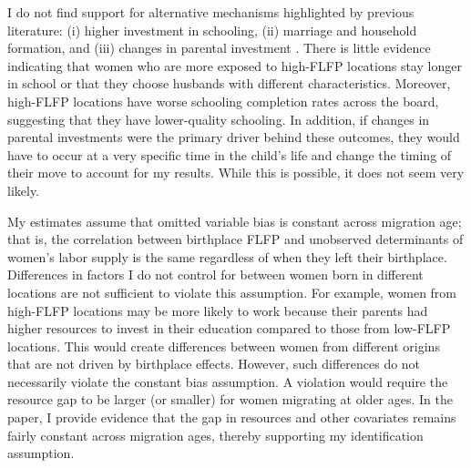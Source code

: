 \documentclass[a4paper, 11pt]{article}
\begin{document}
I do not find support for alternative mechanisms highlighted by previous literature: (i) higher investment in schooling, (ii) marriage and household formation, and (iii) changes in parental investment \citep{Molina2022,Fernandez2004,Blau2011}.  There is little evidence indicating that women who are more exposed to high-FLFP locations stay longer in school or that they choose husbands with different characteristics. Moreover, high-FLFP locations have worse schooling completion rates across the board, suggesting that they have lower-quality schooling. In addition, if changes in parental investments were the primary driver behind these outcomes, they would have to occur at a very specific time in the child's life and change the timing of their move to account for my results. While this is possible, it does not seem very likely.

My estimates assume that omitted variable bias is constant across migration age; that is, the correlation between birthplace FLFP and unobserved determinants of women's labor supply is the same regardless of when they left their birthplace. Differences in factors I do not control for between women born in different locations are not sufficient to violate this assumption. For example, women from high-FLFP locations may be more likely to work because their parents had higher resources to invest in their education compared to those from low-FLFP locations. This would create differences between women from different origins that are not driven by birthplace effects. However, such differences do not necessarily violate the constant bias assumption. A violation would require the resource gap to be larger (or smaller) for women migrating at older ages. In the paper, I provide evidence that the gap in resources and other covariates remains fairly constant across migration ages, thereby supporting my identification assumption.


\end{document}
